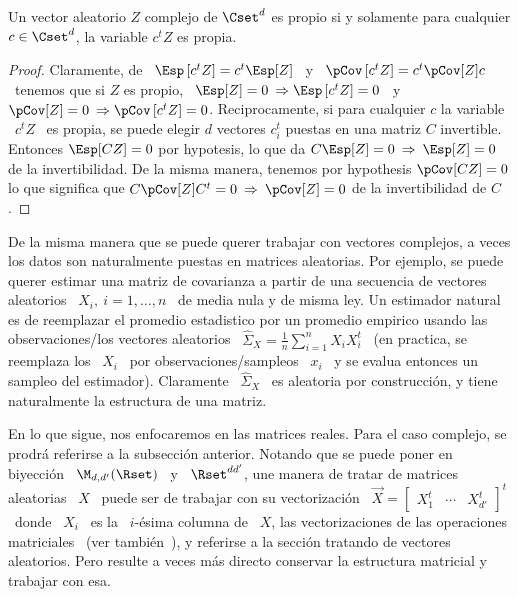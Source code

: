 \begin{teorema}\label{Teo:MP:PropioProy}
%
  Un vector  aleatorio $Z$ complejo de  $\Cset^d$ es propio si  y solamente para
  cualquier $c \in \Cset^d$, la variable $c^t Z$ es propia.
\end{teorema}
\begin{proof}
  Claramente, de \  $\Esp\left[ c^t Z \right] = c^t \Esp[Z]$  \ y \ $\pCov\left[
    c^t Z \right] = c^t \pCov[Z] c$ \ tenemos que si $Z$ es propio, \ $\Esp[Z] =
  0  \: \Rightarrow  \Esp\left[ c^t  Z  \right] =  0$ \  y  \ $\pCov[Z]  = 0  \:
  \Rightarrow \pCov\left[  c^tZ \right] =  0$. \newline Reciprocamente,  si para
  cualquier $c$ la variable \ $c^t Z$  \ es propia, se puede elegir $d$ vectores
  $c_i^t$ puestas  en una matriz  $C$ invertible. Entonces  $\Esp[C Z] =  0$ por
  hypotesis, lo  que da  $C \Esp[Z] =  0 \:  \Rightarrow \: \Esp[Z]  = 0$  de la
  invertibilidad. De la misma manera, tenemos por hypothesis $\pCov[C Z] = 0$ lo
  que significa que  $C \pCov[Z] C^t = 0  \: \Rightarrow \: \pCov[Z] =  0$ de la
  invertibilidad de $C$.
\end{proof}



\label{Ssec:MP:MA}

De la misma manera que se  puede querer trabajar con vectores complejos, a veces
los datos son naturalmente puestas en matrices aleatorias. Por ejemplo, se puede
querer estimar  una matriz de covarianza  a partir de una  secuencia de vectores
aleatorios \  $X_i, \: i =  1, \ldots ,  n$ \ de media  nula y de misma  ley. Un
estimador  natural es  de reemplazar  el  promedio estadistico  por un  promedio
empirico usando las  observaciones/los vectores aleatorios \ $\widehat{\Sigma}_X
= \frac1n \sum_{i=1}^n X_i X_i^t$ \ (en practica, se reemplaza los \ $X_i$ \ por
observaciones/sampleos  \  $x_i$   \  y  se  evalua  entonces   un  sampleo  del
estimador). Claramente \ $\widehat{\Sigma}_X$ \ es aleatoria por construcci\'on,
y tiene naturalmente la estructura de una matriz.

En lo que sigue, nos enfocaremos  en las matrices reales. Para el caso complejo,
se prodr\'a referirse a la subsecci\'on  anterior. Notando que se puede poner en
biyecci\'on \ $\M_{d,d'}(\Rset)$  \ y \ $\Rset^{d d'}$, une  manera de tratar de
matrices  aleatorias \  $X$ \  puede ser  de trabajar  con su  vectorizaci\'on \
$\vec{X} = \begin{bmatrix} X_1^t &  \cdots & X_{d'}^t \end{bmatrix}^t$ \ donde \
$X_i$  \ es  la  \ $i$-\'esima  columna de  \  $X$, las  vectorizaciones de  las
operaciones  matriciales~\cite[Cap.~2]{MagNeu79}  (ver tambi\'en~\cite{NeuWan83,
  Har08}), y  referirse a  la secci\'on tratando  de vectores  aleatorios.  Pero
resulte a veces  m\'as directo conservar la estructura  matricial y trabajar con
esa.

